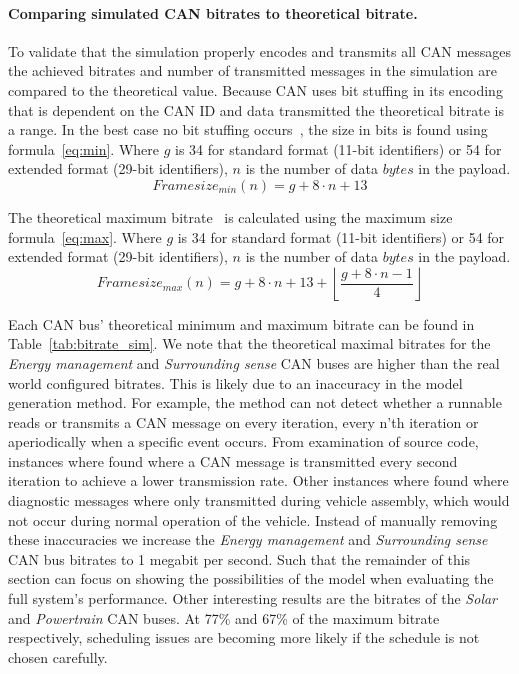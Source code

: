 \paragraph{Comparing simulated CAN bitrates to theoretical bitrate.}

To validate that the simulation properly encodes and transmits all CAN messages the achieved bitrates and number of transmitted messages in the simulation are compared to the theoretical value. Because CAN uses bit stuffing in its encoding that is dependent on the CAN ID and data transmitted the theoretical bitrate is a range. In the best case no bit stuffing occurs~\cite{davis2007controller}, the size in bits is found using formula~\ref{eq:min}. Where $g$ is 34 for standard format (11-bit identifiers) or 54 for extended format (29-bit identifiers), $n$ is the number of data $bytes$ in the payload.
\begin{equation}
    \label{eq:min}
    Framesize_{min}(n) = g+8\cdot n + 13
\end{equation}

The theoretical maximum bitrate~\cite{davis2007controller} is calculated using the maximum size formula~\ref{eq:max}. Where $g$ is 34 for standard format (11-bit identifiers) or 54 for extended format (29-bit identifiers), $n$ is the number of data $bytes$ in the payload.
\begin{equation}
    \label{eq:max}
Framesize_{max}(n) = g +8\cdot n +13 +\left\lfloor\frac{g+8\cdot n-1}{4}\right\rfloor
\end{equation}

Each CAN bus' theoretical minimum and maximum bitrate can be found in Table~\ref{tab:bitrate_sim}. We note that the theoretical maximal bitrates for the \textit{Energy management} and \textit{Surrounding sense} CAN buses are higher than the real world configured bitrates. This is likely due to an inaccuracy in the model generation method. For example, the method can not detect whether a runnable reads or transmits a CAN message on every iteration, every n'th iteration or aperiodically when a specific event occurs. From examination of source code, instances where found where a CAN message is transmitted every second iteration to achieve a lower transmission rate. Other instances where found where diagnostic messages where only transmitted during vehicle assembly, which would not occur during normal operation of the vehicle. Instead of manually removing these inaccuracies we increase the \textit{Energy management} and \textit{Surrounding sense} CAN bus bitrates to 1 megabit per second. Such that the remainder of this section can focus on showing the possibilities of the model when evaluating the full system's performance. Other interesting results are the bitrates of the \textit{Solar} and \textit{Powertrain} CAN buses. At 77\% and 67\% of the maximum bitrate respectively, scheduling issues are becoming more likely if the schedule is not chosen carefully.

